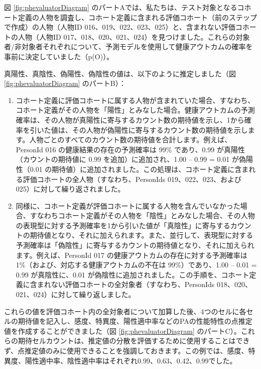 \documentclass[
  11pt]{book}
\theoremstyle{definition}
\theoremstyle{definition}
\theoremstyle{definition}
\theoremstyle{definition}
\theoremstyle{remark}
\begin{document}
図 \ref{fig:phevaluatorDiagram} のパートAでは、私たちは、テスト対象となるコホート定義の人物を調査し、コホート定義に含まれる評価コホート（前のステップで作成）の人物（人物ID 016、019、022、023、025）と、含まれない評価コホートの人物（人物ID 017、018、020、021、024）を見つけました。これらの対象者/非対象者それぞれについて、予測モデルを使用して健康アウトカムの確率を事前に決定していました（p(O)）。

真陽性、真陰性、偽陽性、偽陰性の値は、以下のように推定しました（図 \ref{fig:phevaluatorDiagram} のパートB）：

\begin{enumerate}
\def\labelenumi{\arabic{enumi}.}
\item
  コホート定義に評価コホートに属する人物が含まれていた場合、すなわち、コホート定義がその人物を「陽性」とみなした場合。健康アウトカムの予測確率は、その人物が真陽性に寄与するカウント数の期待値を示し、1から確率を引いた値は、その人物が偽陽性に寄与するカウント数の期待値を示します。人物ごとのすべてのカウント数の期待値を合計します。例えば、PersonId 016 の健康結果の存在の予測確率は 99\% であり、0.99 が真陽性（カウントの期待値に 0.99 を追加）に追加され、1.00 -- 0.99 = 0.01 が偽陽性（0.01 の期待値）に追加されました。この処理は、コホート定義に含まれる評価コホートの全人物（すなわち、PersonIds 019、022、023、および 025）に対して繰り返されました。
\item
  同様に、コホート定義が評価コホートに属する人物を含んでいなかった場合、すなわちコホート定義がその人物を「陰性」とみなした場合、その人物の表現型に対する予測確率を1から引いた値が「真陰性」に寄与するカウントの期待値となり、それに加えられます。また、並行して、表現型に対する予測確率は「偽陰性」に寄与するカウントの期待値となり、それに加えられます。例えば、PersonId 017 の健康アウトカムの存在に対する予測確率は 1\%（および、対応する健康アウトカムの不在は 99\%）であり、1.00 -- 0.01 = 0.99 が真陰性に、0.01 が偽陰性に追加されました。この手順を、コホート定義に含まれない評価コホートの全対象者（すなわち、PersonIds 018、020、021、024）に対して繰り返しました。
\end{enumerate}

これらの値を評価コホート内の全対象者について加算した後、4つのセルに各セルの期待値を記入し、感度、特異度、陽性適中率などのPAの性能特性の点推定値を作成することができました（図 \ref{fig:phevaluatorDiagram} のパートC）。これらの期待セルカウントは、推定値の分散を評価するために使用することはできず、点推定値のみに使用できることを強調しておきます。この例では、感度、特異度、陽性適中率、陰性適中率はそれぞれ0.99、0.63、0.42、0.99でした。
\end{document}
